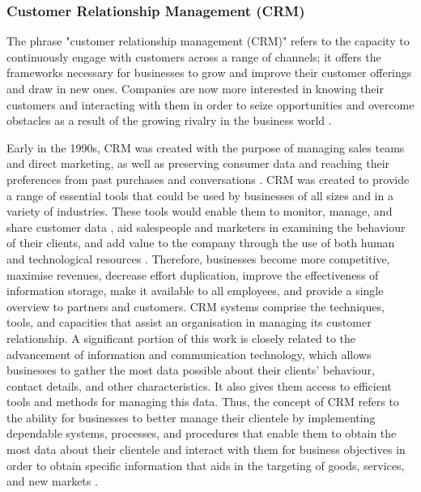 \subsubsection{Customer Relationship Management (CRM)}
\par{The phrase "customer relationship management (CRM)" refers to the capacity to continuously engage with customers across a range of channels; it offers the frameworks necessary for businesses to grow and improve their customer offerings and draw in new ones. Companies are now more interested in knowing their customers and interacting with them in order to seize opportunities and overcome obstacles as a result of the growing rivalry in the business world \citep{kostojohn2011crm}.

Early in the 1990s, CRM was created with the purpose of managing sales teams and direct marketing, as well as preserving consumer data and reaching their preferences from past purchases and conversations \citep{bygstad2013social}. CRM was created to provide a range of essential tools that could be used by businesses of all sizes and in a variety of industries. These tools would enable them to monitor, manage, and share customer data \citep{smilansky2015select}, aid salespeople and marketers in examining the behaviour of their clients, and add value to the company through the use of both human and technological resources \citep{bibiano2014initial}. Therefore, businesses become more competitive, maximise revenues, decrease effort duplication, improve the effectiveness of information storage, make it available to all employees, and provide a single overview to partners and customers. CRM systems comprise the techniques, tools, and capacities that assist an organisation in managing its customer relationship. A significant portion of this work is closely related to the advancement of information and communication technology, which allows businesses to gather the most data possible about their clients' behaviour, contact details, and other characteristics. It also gives them access to efficient tools and methods for managing this data. Thus, the concept of CRM refers to the ability for businesses to better manage their clientele by implementing dependable systems, processes, and procedures that enable them to obtain the most data about their clientele and interact with them for business objectives in order to obtain specific information that aids in the targeting of goods, services, and new markets \citep{ronchi2009eculture}.}
